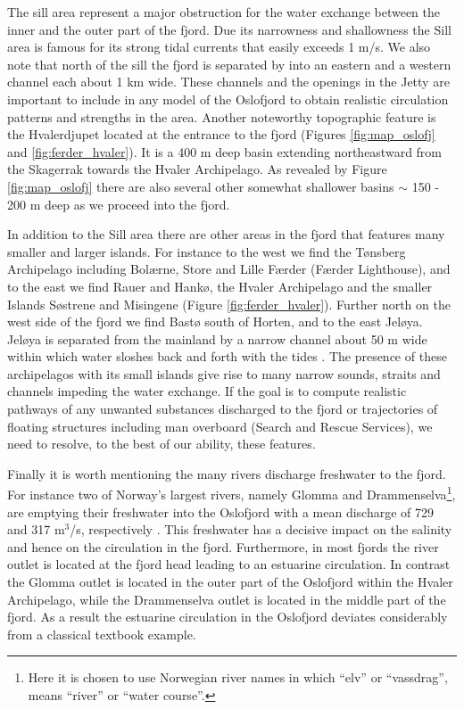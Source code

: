The sill area represent a major obstruction for the water exchange between the inner and the outer part of the fjord. Due its narrowness and shallowness the {\DR} Sill area is famous for its strong tidal currents that easily exceeds 1 m/s. We also note that north of the sill the fjord is separated by {\HAA} into an eastern and a western channel each about 1 km wide. These channels and the openings in the Jetty are important to include in any model of the Oslofjord to obtain realistic circulation patterns and strengths in the area. Another noteworthy topographic feature is the Hvalerdjupet located at the entrance to the fjord (Figures \ref{fig:map_oslofj} and \ref{fig:ferder_hvaler}). It is a 400 m deep basin extending northeastward from the Skagerrak towards the Hvaler Archipelago. As revealed by Figure \ref{fig:map_oslofj} there are also several other somewhat shallower basins $\sim$ 150 - 200 m deep as we proceed into the fjord. 
 

In addition to the {\DR} Sill area there are other areas in the fjord that features many smaller and larger islands. For instance to the west we find the T{\o}nsberg Archipelago including Bol{\ae}rne, Store and Lille F{\ae}rder (F{\ae}rder Lighthouse), and to the east we find Rauer and Hank{\o}, the Hvaler Archipelago and the smaller Islands S{\o}strene and Misingene (Figure \ref{fig:ferder_hvaler}). Further north on the west side of the fjord we find Bast{\o} south of Horten, and to the east Jel{\o}ya. Jel{\o}ya is separated from the mainland by a narrow channel about 50 m wide within which water sloshes back and forth with the tides \citep{hjelm:etal:2014}. The presence of these archipelagos with its small islands give rise to many narrow sounds, straits and channels impeding the water exchange. If the goal is to compute realistic pathways of any unwanted substances discharged to the fjord or trajectories of floating structures including man overboard (Search and Rescue Services), we need to resolve, to the best of our ability, these features. 

Finally it is worth mentioning the many rivers discharge freshwater to the fjord. For instance two of Norway's largest rivers, namely Glomma and Drammenselva\footnote{Here it is chosen to use Norwegian river names in which ``elv'' or ``vassdrag'', means ``river'' or ``water course''.}, are emptying their freshwater into the Oslofjord with a mean discharge of 729 and 317 m$^3$/s, respectively \citep{milli:etal:2011}. This freshwater has a decisive impact on the salinity and hence on the circulation in the fjord. Furthermore, in most fjords the river outlet is located at the fjord head leading to an estuarine circulation. In contrast the Glomma outlet is located in the outer part of the Oslofjord within the Hvaler Archipelago, while the Drammenselva outlet is located in the middle part of the fjord. As a result the estuarine circulation in the Oslofjord deviates considerably from a classical textbook example.        


